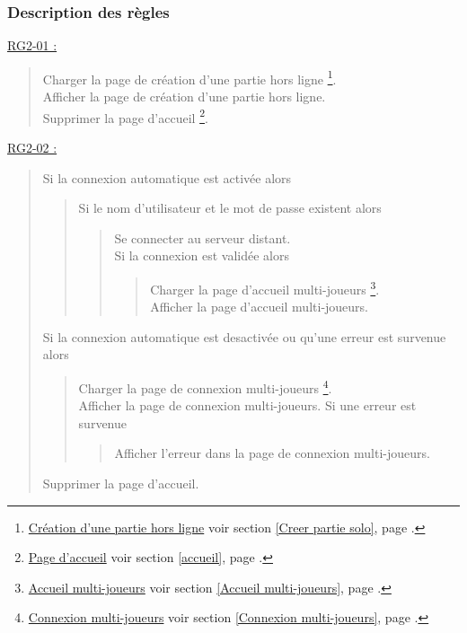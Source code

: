 \documentclass{report}
\begin{document}
\newpage

		\subsubsection{Description des règles}
		
		\underline{RG2-01 :}
			\begin{quote}
				Charger la page de création d'une partie hors ligne%
					\footnote{
						\hyperlink{Creer partie solo}{Création d'une partie hors ligne}
						\og voir section \ref{Creer partie solo}, page \pageref{Creer partie solo}.\fg
					}.\\
				Afficher la page de création d'une partie hors ligne\footnotemark[1].\\
				Supprimer la page d'accueil%
					\footnote{
						\hyperlink{Page d'accueil}{Page d'accueil}
						\og voir section \ref{accueil}, page \pageref{accueil}.\fg
					}.\\ 
			\end{quote}


		\underline{RG2-02 :}
			\begin{quote}
				Si la connexion automatique est activée alors
				\begin{quote}
					Si le nom d'utilisateur et le mot de passe existent alors
					\begin{quote}
						Se connecter au serveur distant.\\
						Si la connexion est validée alors
						\begin{quote}
							Charger la page d'accueil multi-joueurs%
								\footnote{
									\hyperlink{Accueil multi-joueurs}{Accueil multi-joueurs}
									\og voir section \ref{Accueil multi-joueurs}, page \pageref{Accueil multi-joueurs}.\fg
								}.\\
							Afficher la page d'accueil multi-joueurs\footnotemark[3].\\
						\end{quote}
					\end{quote}	
				\end{quote}
				Si la connexion automatique est desactivée ou qu'une erreur est survenue alors 
				\begin{quote}		
					Charger la page de connexion multi-joueurs%
						\footnote{
							\hyperlink{Connexion multi-joueurs}{Connexion multi-joueurs}
							\og voir section \ref{Connexion multi-joueurs}, page \pageref{Connexion multi-joueurs}.\fg
						}.\\
					Afficher la page de connexion multi-joueurs\footnotemark[4].
					Si une erreur est survenue
					\begin{quote}
						Afficher l'erreur dans la page de connexion multi-joueurs\footnotemark[4].
					\end{quote}
				\end{quote}
				Supprimer la page d'accueil\footnotemark[2].\\
			\end{quote}
\end{document}
